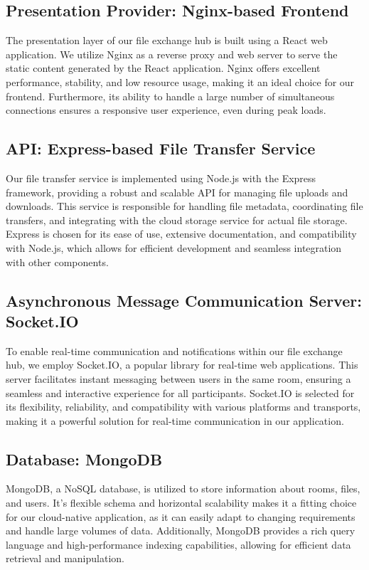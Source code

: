 \documentclass[a4paper,fleqn]{cas-dc}
\begin{document}
\subsection{Presentation Provider: Nginx-based Frontend}

The presentation layer of our file exchange hub is built using a React web application. We utilize Nginx as a reverse proxy and web server to serve the static content generated by the React application. Nginx offers excellent performance, stability, and low resource usage, making it an ideal choice for our frontend. Furthermore, its ability to handle a large number of simultaneous connections ensures a responsive user experience, even during peak loads.

\subsection{API: Express-based File Transfer Service}

Our file transfer service is implemented using Node.js with the Express framework, providing a robust and scalable API for managing file uploads and downloads. This service is responsible for handling file metadata, coordinating file transfers, and integrating with the cloud storage service for actual file storage. Express is chosen for its ease of use, extensive documentation, and compatibility with Node.js, which allows for efficient development and seamless integration with other components.

\subsection{Asynchronous Message Communication Server: Socket.IO}

To enable real-time communication and notifications within our file exchange hub, we employ Socket.IO, a popular library for real-time web applications. This server facilitates instant messaging between users in the same room, ensuring a seamless and interactive experience for all participants. Socket.IO is selected for its flexibility, reliability, and compatibility with various platforms and transports, making it a powerful solution for real-time communication in our application.

\subsection{Database: MongoDB}

MongoDB, a NoSQL database, is utilized to store information about rooms, files, and users. It's flexible schema and horizontal scalability makes it a fitting choice for our cloud-native application, as it can easily adapt to changing requirements and handle large volumes of data. Additionally, MongoDB provides a rich query language and high-performance indexing capabilities, allowing for efficient data retrieval and manipulation.
\end{document}

